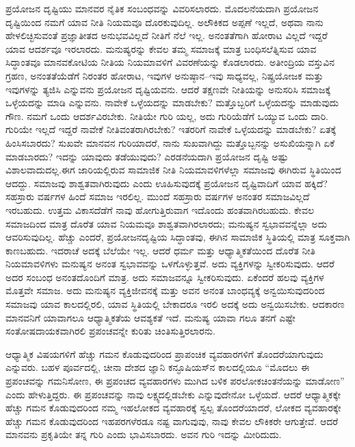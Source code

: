ಪ್ರಯೋಜನ ದೃಷ್ಟಿಯು ಮಾನವರ ನೈತಿಕ ಸಂಬಂಧವನ್ನು ವಿವರಿಸಲಾರದು. ಮೊದಲನೆಯದಾಗಿ ಪ್ರಯೋಜನ ದೃಷ್ಟಿಯಿಂದ ನಮಗೆ ಯಾವ ನೀತಿ ನಿಯಮವೂ ದೊರಕುವುದಿಲ್ಲ. ಅಲೌಕಿಕದ ಅಪ್ಪಣೆ ಇಲ್ಲದೆ, ಅಥವಾ ನಾನು ಹೇಳಲಿಚ್ಛಿಸುವಂತೆ ಪ್ರಜ್ಞಾತೀತದ ಅನುಭವವಿಲ್ಲದೆ ನೀತಿಗೆ ನೆಲೆ ಇಲ್ಲ. ಅನಂತತೆಗಾಗಿ ಹೋರಾಟ ವಿಲ್ಲದೆ ಇದ್ದರೆ ಯಾವ ಆದರ್ಶವೂ ಇರಲಾರದು. ಮನುಷ್ಯರನ್ನು ಕೇವಲ ತಮ್ಮ ಸಮಾಜಕ್ಕೆ ಮಾತ್ರ ಬಂಧಿಸಲೆತ್ನಿಸುವ ಯಾವ ಸಿದ್ಧಾಂತವೂ ಮಾನವಕೋಟಿಯ ನೀತಿಯ ನಿಯಮಾವಳಿಗೆ ವಿವರಣೆಯನ್ನು ಕೊಡಲಾರದು. ಅತೀಂದ್ರಿಯ ವಸ್ತುವಿನ ಗ್ರಹಣ, ಅನಂತತೆಯೆಡೆಗೆ ನಿರಂತರ ಹೋರಾಟ, ಇವುಗಳ ಅನುಷ್ಠಾನ–ಇವು ಸಾಧ್ಯವಲ್ಲ, ನಿಷ್ಪ್ರಯೋಜಕ ಮತ್ತು ಇವುಗಳನ್ನು ತ್ಯಜಿಸಿ ಎನ್ನುವನು ಪ್ರಯೋಜನ ದೃಷ್ಟಿಯವನು. ಆದರೆ ತಕ್ಷಣವೇ ನೀತಿಯನ್ನು ಅನುಸರಿಸಿ ಸಮಾಜಕ್ಕೆ ಒಳ್ಳೆಯದನ್ನು ಮಾಡಿ ಎನ್ನುವನು. ನಾವೇಕೆ ಒಳ್ಳೆಯದನ್ನು ಮಾಡಬೇಕು? ಮತ್ತೊಬ್ಬರಿಗೆ ಒಳ್ಳೆಯದನ್ನು ಮಾಡುವುದು ಗೌಣ. ನಮಗೆ ಒಂದು ಆದರ್ಶವಿರಬೇಕು. ನೀತಿಯೇ ಗುರಿ ಯಲ್ಲ, ಅದು ಗುರಿಯೆಡೆಗೆ ಒಯ್ಯುವ ಒಂದು ದಾರಿ. ಗುರಿಯೇ ಇಲ್ಲದೆ ಇದ್ದರೆ ನಾವೇಕೆ ನೀತಿವಂತರಾಗಿರಬೇಕು? ಇತರರಿಗೆ ನಾವೇಕೆ ಒಳ್ಳೆಯದನ್ನು ಮಾಡಬೇಕು? ಏತಕ್ಕೆ ಹಿಂಸಿಸಬಾರದು? ಸುಖವೇ ಮಾನವನ ಗುರಿಯಾದರೆ, ನಾನು ಸುಖವಾಗಿದ್ದು ಮತ್ತೊಬ್ಬನನ್ನು ಅಸುಖಿಯನ್ನಾಗಿ ಏಕೆ ಮಾಡಬಾರದು? ಇದನ್ನು ಯಾವುದು ತಡೆಯುವುದು? ಎರಡನೆಯದಾಗಿ ಪ್ರಯೋಜನ ದೃಷ್ಟಿ ಅಷ್ಟು ವಿಶಾಲವಾದುದಲ್ಲ.ಈಗ ಜಾರಿಯಲ್ಲಿರುವ ಸಾಮಾಜಿಕ ನೀತಿ ನಿಯಮಾವಳಿಗಳೆಲ್ಲಾ ಸಮಾಜವು ಈಗಿರುವ ಸ್ಥಿತಿಯಿಂದ ಆದದ್ದು. ಸಮಾಜವು ಶಾಶ್ವತವಾಗಿರುವುದು ಎಂದು ಊಹಿಸುವುದಕ್ಕೆ ಪ್ರಯೋಜನ ದೃಷ್ಟಿವಾದಿಗೆ ಯಾವ ಹಕ್ಕಿದೆ? ಸಹಸ್ರಾರು ವರ್ಷಗಳ ಹಿಂದೆ ಸಮಾಜ ಇರಲಿಲ್ಲ. ಮುಂದೆ ಸಹಸ್ರಾರು ವರ್ಷಗಳ ಅನಂತರ ಸಮಾಜವಿಲ್ಲದೆ ಇರಬಹುದು. ಉತ್ತಮ ವಿಕಾಸದೆಡೆಗೆ ನಾವು ಹೋಗುತ್ತಿರುವಾಗ ಇದೊಂದು ಹಂತವಾಗಿರಬಹುದು. ಕೇವಲ ಸಮಾಜದಿಂದ ಮಾತ್ರ ದೊರೆತ ಯಾವ ನಿಯಮವೂ ಶಾಶ್ವತವಾಗಿರಲಾರದು; ಮನುಷ್ಯನ ಸ್ವಭಾವವನ್ನೆಲ್ಲಾ ಅದು ಆವರಿಸುವುದಿಲ್ಲ. ಹೆಚ್ಚು ಎಂದರೆ, ಪ್ರಯೋಜನದೃಷ್ಟಿಯ ಸಿದ್ಧಾಂತವು, ಈಗಿನ ಸಾಮಾಜಿಕ ಸ್ಥಿತಿಯಲ್ಲಿ ಮಾತ್ರ ಸೂಕ್ತವಾಗಿ ಕಾಣಬಹುದು. ಇದರಾಚೆ ಅದಕ್ಕೆ ಬೆಲೆಯೇ ಇಲ್ಲ. ಆದರೆ ಧರ್ಮ ಮತ್ತು ಆಧ್ಯಾತ್ಮಿಕತೆಯಿಂದ ದೊರೆತ ನೀತಿ ನಿಯಮಾವಳಿಗಳು ಮನುಷ್ಯನ ಅನಂತ ಸ್ವಭಾವವನ್ನು ಒಳಗೊಳ್ಳುತ್ತವೆ. ಅದು ವ್ಯಕ್ತಿಗಳನ್ನು ಸ್ವೀಕರಿಸುವುದು. ಆದರೆ ಅದರ ಸಂಬಂಧ ಅನಂತದೊಂದಿಗೆ ಮಾತ್ರ. ಅದು ಸಮಾಜವನ್ನೂ ಸ್ವೀಕರಿಸುವುದು. ಏಕೆಂದರೆ ಹಲವು ವ್ಯಕ್ತಿಗಳ ಮೊತ್ತವೇ ಸಮಾಜ. ಅದು ಮನುಷ್ಯನ ವ್ಯಕ್ತಿಜೀವನಕ್ಕೆ ಮತ್ತು ಅವನ ಅನಂತ ಬಾಂಧವ್ಯಕ್ಕೆ ಅನ್ವಯಿಸುವುದರಿಂದ ಸಮಾಜವು ಯಾವ ಕಾಲದಲ್ಲಿರಲಿ, ಯಾವ ಸ್ಥಿತಿಯಲ್ಲಿ ಬೇಕಾದರೂ ಇರಲಿ ಅದಕ್ಕೆ ಅದು ಅನ್ವಯಿಸಬೇಕು. ಆದಕಾರಣ ಮಾನವನಿಗೆ ಯಾವಾಗಲೂ ಆಧ್ಯಾತ್ಮಿಕತೆಯ ಆವಶ್ಯಕತೆ ಇದೆ. ಮನುಷ್ಯ ಯಾವಾ ಗಲೂ ತನಗೆ ಎಷ್ಟೇ ಸಂತೋಷದಾಯಕವಾಗಿರಲಿ ಪ್ರಪಂಚವನ್ನೇ ಕುರಿತು ಚಿಂತಿಸುತ್ತಿರಲಾರನು.

ಆಧ್ಯಾತ್ಮಿಕ ವಿಷಯಗಳಿಗೆ ಹೆಚ್ಚು ಗಮನ ಕೊಡುವುದರಿಂದ ಪ್ರಾಪಂಚಿಕ ವ್ಯವಹಾರಗಳಿಗೆ ತೊಂದರೆಯಾಗುವುದು ಎನ್ನುವರು. ಬಹಳ ಪೂರ್ವದಲ್ಲಿ, ಚೀನಾ ದೇಶದ ಜ್ಞಾನಿ ಕನ್ಫೂಷಿಯಸ್​ನ ಕಾಲದಲ್ಲಿಯೂ “ಮೊದಲು ಈ ಪ್ರಪಂಚವನ್ನು ಗಮನಿಸೋಣ, ಈ ಪ್ರಪಂಚದ ವ್ಯವಹಾರಗಳು ಮುಗಿದ ಬಳಿಕ ಪರಲೋಕಚಿಂತನೆಯನ್ನು ಮಾಡೋಣ” ಎಂದು ಹೇಳುತ್ತಿದ್ದರು. ಈ ಪ್ರಪಂಚವನ್ನು ನಾವು ಲಕ್ಷ್ಯದಲ್ಲಿಡಬೇಕು ಎನ್ನುವುದೇನೋ ಒಳ್ಳೆಯದೆ. ಆದರೆ ಆಧ್ಯಾತ್ಮಿಕಕ್ಕೇ ಹೆಚ್ಚು ಗಮನ ಕೊಡುವುದರಿಂದ ನಮ್ಮ ಇಹಲೋಕದ ವ್ಯವಹಾರಕ್ಕೆ ಸ್ವಲ್ಪ ತೊಂದರೆಯಾದರೆ, ಲೋಕದ ವ್ಯವಹಾರಕ್ಕೇ ಹೆಚ್ಚು ಗಮನ ಕೊಡುವುದರಿಂದ ಇಹಪರಗಳೆರಡೂ ನಷ್ಟ ವಾಗುವುವು, ನಾವು ಕೇವಲ ಲೌಕಿಕರೇ ಆಗುತ್ತೇವೆ. ಆದರೆ ಮಾನವನು ಪ್ರಕೃತಿಯೇ ತನ್ನ ಗುರಿ ಎಂದು ಭಾವಿಸಬಾರದು. ಅವನ ಗುರಿ ಇದನ್ನು ಮೀರಿದುದು.

